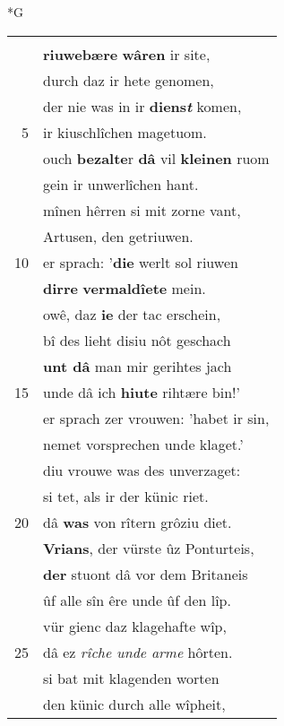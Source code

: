 \documentclass[8pt,a4paper,notitlepage]{article}
\begin{document}
\newpage
\begin{table}[ht]
\begin{minipage}[t]{0.5\linewidth}
\small
\begin{center}*G
\end{center}
\begin{tabular}{rl}
 & \textbf{\begin{large}D\end{large}iu juncvrouwe reit} uns mite.\\ 
 & \textbf{riuwebære} \textbf{wâren} ir site,\\ 
 & durch daz ir hete genomen,\\ 
 & der nie was in ir \textbf{diens\textit{t}} komen,\\ 
5 & ir kiuschlîchen magetuom.\\ 
 & ouch \textbf{bezalte}r \textbf{dâ} vil \textbf{kleinen} ruom\\ 
 & gein ir unwerlîchen hant.\\ 
 & mînen hêrren si mit zorne vant,\\ 
 & Artusen, den getriuwen.\\ 
10 & er sprach: '\textbf{die} werlt sol riuwen\\ 
 & \textbf{dirre} \textbf{vermaldîete} mein.\\ 
 & owê, daz \textbf{ie} der tac erschein,\\ 
 & bî des lieht disiu nôt geschach\\ 
 & \textbf{unt dâ} man mir gerihtes jach\\ 
15 & unde dâ ich \textbf{hiute} rihtære bin!'\\ 
 & er sprach zer vrouwen: 'habet ir sin,\\ 
 & nemet vorsprechen unde klaget.'\\ 
 & diu vrouwe was des unverzaget:\\ 
 & si tet, als ir der künic riet.\\ 
20 & dâ \textbf{was} von rîtern grôziu diet.\\ 
 & \textbf{Vrians}, der vürste ûz Ponturteis,\\ 
 & \textbf{der} stuont dâ vor dem Britaneis\\ 
 & ûf alle sîn êre unde ûf den lîp.\\ 
 & vür gienc daz klagehafte wîp,\\ 
25 & dâ ez \textit{rîche unde arme} hôrten.\\ 
 & si bat mit klagenden worten\\ 
 & den künic durch alle wîpheit,\\ 

\end{tabular}
\end{minipage}
\end{table}
\end{document}
